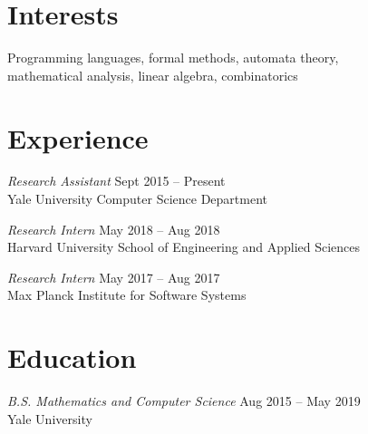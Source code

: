 \documentclass[margin]{res}
\begin{document}
 

 
\address{\textbf{Address} \\
         17 Broadway 2L \\
         New Haven, CT 06511}
 
\address{\textbf{Contact} \\
         \href{antonxue.github.io}{\texttt{antonxue.github.io}} \\
         \texttt{anton.xue@yale.edu}}

\begin{resume} 
 
\section{Interests} 
Programming languages, formal methods, automata theory, \\
mathematical analysis, linear algebra, combinatorics


\section{Experience}
\textit{Research Assistant} \hfill Sept 2015 -- Present \\
Yale University Computer Science Department

\textit{Research Intern} \hfill May 2018 -- Aug 2018 \\
Harvard University School of Engineering and Applied Sciences

\textit{Research Intern} \hfill May 2017 -- Aug 2017 \\
Max Planck Institute for Software Systems

\section{Education} 
\textit{B.S. Mathematics and Computer Science}
  \hfill Aug 2015 -- May 2019 \\
Yale University




\end{resume}
\end{document}
